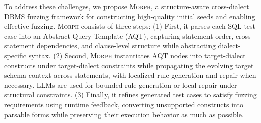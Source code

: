 \documentclass[conference]{IEEEtran}
\newcommand{\tool}{\textsc{Morph}\xspace}
\begin{document}
To address these challenges, we propose \tool{}, a structure-aware cross-dialect DBMS fuzzing framework for constructing high-quality initial seeds and enabling effective fuzzing.
\tool{} consists of three steps:
(1) First, it parses each SQL test case into an Abstract Query Template (AQT), capturing statement order, cross-statement dependencies, and clause-level structure while abstracting dialect-specific syntax.
(2) Second, \tool{} instantiates AQT nodes into target-dialect constructs under target-dialect constraints while propagating the evolving target schema context across statements, with localized rule generation and repair when necessary.
LLMs are used for bounded rule generation or local repair under structural constraints.
(3) Finally, it refines generated test cases to satisfy fuzzing requirements using runtime feedback, converting unsupported constructs into parsable forms while preserving their execution behavior as much as possible.
\end{document}
